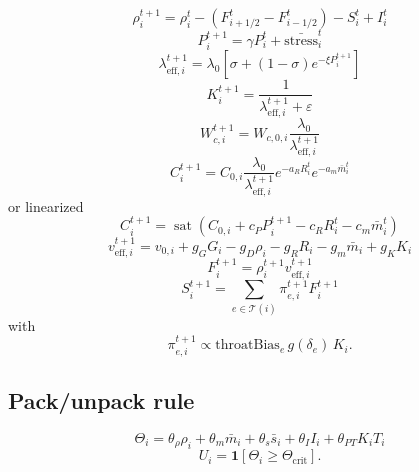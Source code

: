 \documentclass[11pt,a4paper]{article}
\begin{document}
\begin{equation}
\rho_i^{t+1}
=
\rho_i^t-(F_{i+1/2}^t-F_{i-1/2}^t)-S_i^t+I_i^t
\label{eq:density}
\end{equation}
\begin{equation}
P_i^{t+1}=\gamma P_i^t+\bar{\mathrm{stress}}_i^t
\label{eq:section_pressure}
\end{equation}
\begin{equation}
\lambda_{\mathrm{eff},i}^{t+1}
=
\lambda_0\left[\sigma+(1-\sigma)e^{-\xi P_i^{t+1}}\right]
\label{eq:section_lambda}
\end{equation}
\begin{equation}
K_i^{t+1}=\frac{1}{\lambda_{\mathrm{eff},i}^{t+1}+\varepsilon}
\label{eq:section_compliance}
\end{equation}
\begin{equation}
W_{c,i}^{t+1}=W_{c,0,i}\frac{\lambda_0}{\lambda_{\mathrm{eff},i}^{t+1}}
\label{eq:section_width}
\end{equation}
\begin{equation}
C_i^{t+1}=
C_{0,i}\frac{\lambda_0}{\lambda_{\mathrm{eff},i}^{t+1}}
e^{-a_R R_i^t}e^{-a_m\bar m_i^t}
\label{eq:section_capacity_exp}
\end{equation}
or linearized
\begin{equation}
C_i^{t+1}=
\operatorname{sat}(C_{0,i}+c_P P_i^{t+1}-c_R R_i^t-c_m\bar m_i^t)
\label{eq:section_capacity_lin}
\end{equation}
\begin{equation}
v_{\mathrm{eff},i}^{t+1}
=
v_{0,i}+g_GG_i-g_D\rho_i-g_RR_i-g_m\bar m_i+g_KK_i
\label{eq:veff}
\end{equation}
\begin{equation}
F_i^{t+1}=\rho_i^{t+1}v_{\mathrm{eff},i}^{t+1}
\label{eq:flux}
\end{equation}
\begin{equation}
S_i^{t+1}=\sum_{e\in\mathcal{T}(i)}\pi_{e,i}^{t+1}F_i^{t+1}
\label{eq:siphon}
\end{equation}
with
\begin{equation}
\pi_{e,i}^{t+1}\propto \mathrm{throatBias}_e\,g(\delta_e)\,K_i.
\label{eq:siphon_fraction}
\end{equation}

\subsection{Pack/unpack rule}

\begin{equation}
\Theta_i=
\theta_\rho \rho_i+\theta_m\bar m_i+\theta_s\bar s_i+\theta_I I_i+\theta_{PT}K_iT_i
\label{eq:unpack_score}
\end{equation}
\begin{equation}
U_i=\mathbf{1}[\Theta_i\ge \Theta_{\mathrm{crit}}].
\label{eq:mode_indicator}
\end{equation}
\end{document}
